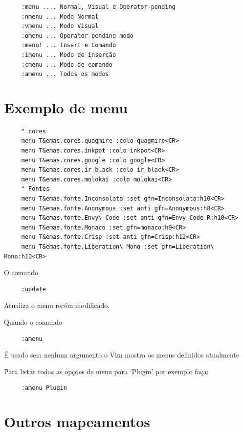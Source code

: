 \documentclass[10pt,a4paper,openany]{book}
\begin{document}
\begin{verbatim}
     :menu .... Normal, Visual e Operator-pending
     :nmenu ... Modo Normal
     :vmenu ... Modo Visual
     :omenu ... Operator-pending modo
     :menu! ... Insert e Comando
     :imenu ... Modo de inserção
     :cmenu ... Modo de comando
     :amenu ... Todos os modos
\end{verbatim}

\section{Exemplo de menu}
\label{Exemplo de menu}

\begin{verbatim}
     " cores
     menu T&emas.cores.quagmire :colo quagmire<CR>
     menu T&emas.cores.inkpot :colo inkpot<CR>
     menu T&emas.cores.google :colo google<CR>
     menu T&emas.cores.ir_black :colo ir_black<CR>
     menu T&emas.cores.molokai :colo molokai<CR>
     " Fontes
     menu T&emas.fonte.Inconsolata :set gfn=Inconsolata:h10<CR>
     menu T&emas.fonte.Anonymous :set anti gfn=Anonymous:h8<CR>
     menu T&emas.fonte.Envy\ Code :set anti gfn=Envy_Code_R:h10<CR>
     menu T&emas.fonte.Monaco :set gfn=monaco:h9<CR>
     menu T&emas.fonte.Crisp :set anti gfn=Crisp:h12<CR>
     menu T&emas.fonte.Liberation\ Mono :set gfn=Liberation\ Mono:h10<CR>
\end{verbatim}

O comando

\begin{verbatim}
     :update
\end{verbatim}

Atualiza o menu recém modificado.

Quando o comando

\begin{verbatim}
     :amenu
\end{verbatim}

É usado sem nenhum argumento o Vim mostra os menus definidos atualmente

Para listar todas as opções de menu para `Plugin' por exemplo faça:

\begin{verbatim}
     :amenu Plugin
\end{verbatim}

\section{Outros mapeamentos}
\label{Outros mapeamentos}
\end{document}
